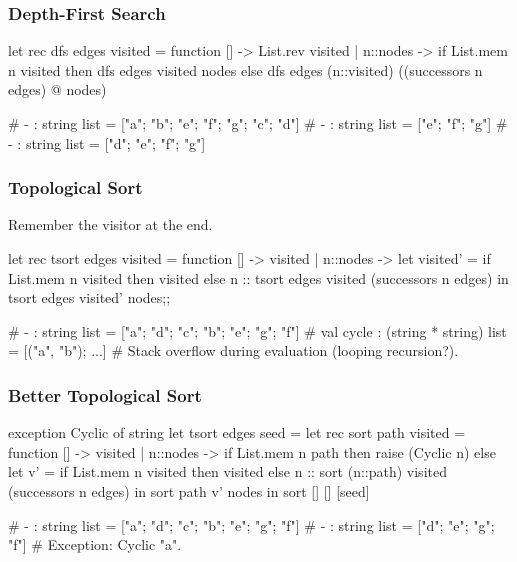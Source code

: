 \documentclass{plt}
\begin{document}
\begin{frame}[fragile]
  \frametitle{Depth-First Search}

\graph

\begin{ocaml}
let rec dfs edges visited = function
  []       -> List.rev visited
| n::nodes ->
  if List.mem n visited then
    dfs edges visited nodes
  else
    dfs edges (n::visited) ((successors n edges) @ nodes)
\end{ocaml}

\begin{interactive}
# 
- : string list = ["a"; "b"; "e"; "f"; "g"; "c"; "d"]
# 
- : string list = ["e"; "f"; "g"]
# 
- : string list = ["d"; "e"; "f"; "g"]
\end{interactive}

\end{frame}

\begin{frame}[fragile]
  \frametitle{Topological Sort}

\graph
Remember the visitor at the end.

\begin{ocaml}
let rec tsort edges visited = function
  []       -> visited
| n::nodes ->
  let visited' = if List.mem n visited then visited
                 else n :: tsort edges visited (successors n edges)
  in tsort edges visited' nodes;;
\end{ocaml}

\begin{interactive}
# 
- : string list = ["a"; "d"; "c"; "b"; "e"; "g"; "f"]
# 
val cycle : (string * string) list = [("a", "b"); ...]
# 
Stack overflow during evaluation (looping recursion?).
\end{interactive}

\end{frame}

\begin{frame}[fragile]
  \frametitle{Better Topological Sort}

\begin{ocaml}
exception Cyclic of string
let tsort edges seed =
  let rec sort path visited = function
     []       -> visited
  |  n::nodes ->
     if List.mem n path then raise (Cyclic n) else
     let v' = if List.mem n visited then visited else
              n :: sort (n::path) visited (successors n edges)
     in sort path v' nodes
  in
  sort [] [] [seed]
\end{ocaml}

\begin{interactive}
# 
- : string list = ["a"; "d"; "c"; "b"; "e"; "g"; "f"]
# 
- : string list = ["d"; "e"; "g"; "f"]
# 
Exception: Cyclic "a".
\end{interactive}

\end{frame}
\end{document}
